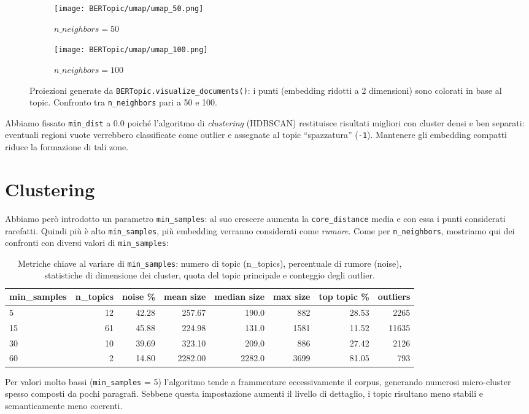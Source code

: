 \begin{figure}[H]
\centering
\begin{subfigure}{0.49\textwidth}
    \centering
    \texttt{[image: BERTopic/umap/umap\_50.png]}
    \caption{$n\_neighbors = 50$}
\end{subfigure}\hfill
\begin{subfigure}{0.49\textwidth}
    \centering
    \texttt{[image: BERTopic/umap/umap\_100.png]}
    \caption{$n\_neighbors = 100$}
\end{subfigure}
\caption{Proiezioni generate da \texttt{BERTopic.\allowbreak visualize\_documents()}: i punti (embedding ridotti a 2 dimensioni) sono colorati in base al topic. Confronto tra \texttt{n\_neighbors} pari a 50 e 100.}
\label{fig:umap-neighbors-comparison}
\end{figure}

\noindent Abbiamo fissato \texttt{min\_dist} a $0.0$ poiché l'algoritmo di \emph{clustering} (HDBSCAN) restituisce risultati migliori con cluster densi e ben separati: eventuali regioni vuote verrebbero classificate come outlier e assegnate al topic ``spazzatura'' (\texttt{-1}). Mantenere gli embedding compatti riduce la formazione di tali zone.

\section{Clustering}
Abbiamo però introdotto un parametro \texttt{min\_samples}: al suo crescere aumenta la \texttt{core\_distance} media e con essa i punti considerati rarefatti.
Quindi più è alto \texttt{min\_samples}, più embedding verranno considerati come \textit{rumore}.
Come per \texttt{n\_neighbors}, mostriamo qui dei confronti con diversi valori di \texttt{min\_samples}:

\begin{table}[H]
\centering
\footnotesize
\begin{tabular}{lrrrrrrr}
\hline
min\_samples & n\_topics & noise \% & mean size & median size & max size & top topic \% & outliers \\
\hline
5  & 12 & 42.28 & 257.67 & 190.0 & 882  & 28.53  & 2265 \\
15 & 61 & 45.88 & 224.98 & 131.0 & 1581 & 11.52 & 11635 \\
30 & 10 & 39.69 & 323.10 & 209.0 & 886  & 27.42  & 2126 \\
60 & 2  & 14.80 & 2282.00 & 2282.0 & 3699 & 81.05  & 793  \\
\hline
\end{tabular}
\caption{Metriche chiave al variare di \texttt{min\_samples}: numero di topic (n\_topics), percentuale di rumore (noise), statistiche di dimensione dei cluster, quota del topic principale e conteggio degli outlier.}
\label{tab:min-samples-summary}
\end{table}
Per valori molto bassi (\texttt{min\_samples} = 5) l'algoritmo tende a frammentare eccessivamente il corpus, generando numerosi micro-cluster spesso composti da pochi paragrafi. 
Sebbene questa impostazione aumenti il livello di dettaglio, i topic risultano meno stabili e semanticamente meno coerenti.

